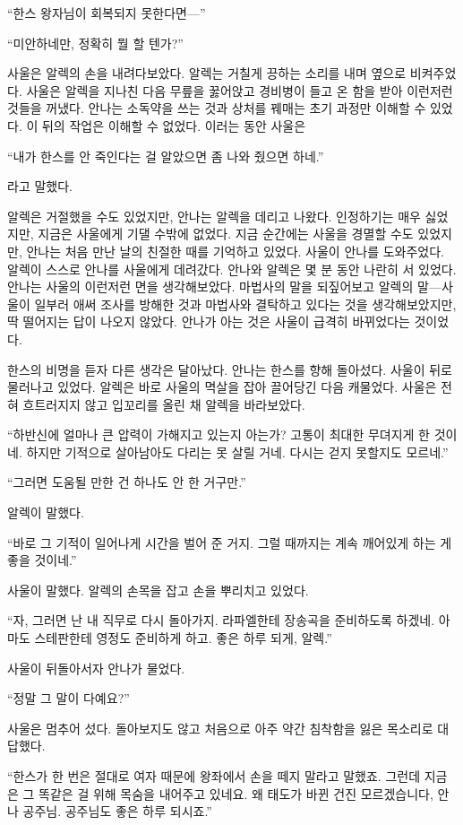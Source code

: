 ``한스 왕자님이 회복되지 못한다면—''

``미안하네만, 정확히 뭘 할 텐가?''

사울은 알렉의 손을 내려다보았다. 알렉는 거칠게 끙하는 소리를 내며 옆으로 비켜주었다. 사울은 알렉을 지나친 다음 무릎을 꿇어앉고 경비병이 들고 온 함을 받아 이런저런 것들을 꺼냈다. 안나는 소독약을 쓰는 것과 상처를 꿰매는 초기 과정만 이해할 수 있었다. 이 뒤의 작업은 이해할 수 없었다.  이러는 동안 사울은

``내가 한스를 안 죽인다는 걸 알았으면 좀 나와 줬으면 하네.''

라고 말했다.

알렉은 거절했을 수도 있었지만, 안나는 알렉을 데리고 나왔다. 인정하기는 매우 싫었지만, 지금은 사울에게 기댈 수밖에 없었다. 지금 순간에는 사울을 경멸할 수도 있었지만, 안나는 처음 만난 날의 친절한 때를 기억하고 있었다. 사울이 안나를 도와주었다. 알렉이 스스로 안나를 사울에게 데려갔다. 안나와 알렉은 몇 분 동안 나란히 서 있었다. 안나는 사울의 이런저런 면을 생각해보았다. 마법사의 말을 되짚어보고 알렉의 말—사울이 일부러 애써 조사를 방해한 것과 마법사와 결탁하고 있다는 것을 생각해보았지만, 딱 떨어지는 답이 나오지 않았다. 안나가 아는 것은 사울이 급격히 바뀌었다는 것이었다.

한스의 비명을 듣자 다른 생각은 달아났다. 안나는 한스를 향해 돌아섰다. 사울이 뒤로 물러나고 있었다. 알렉은 바로 사울의 멱살을 잡아 끌어당긴 다음 캐물었다. 사울은 전혀 흐트러지지 않고 입꼬리를 올린 채 알렉을 바라보았다.

``하반신에 얼마나 큰 압력이 가해지고 있는지 아는가? 고통이 최대한 무뎌지게 한 것이네. 하지만 기적으로 살아남아도 다리는 못 살릴 거네. 다시는 걷지 못할지도 모르네.''

``그러면 도움될 만한 건 하나도 안 한 거구만.''

알렉이 말했다.

``바로 그 기적이 일어나게 시간을 벌어 준 거지. 그럴 때까지는 계속 깨어있게 하는 게 좋을 것이네.''

사울이 말했다. 알렉의 손목을 잡고 손을 뿌리치고 있었다.

``자, 그러면 난 내 직무로 다시 돌아가지. 라파엘한테 장송곡을 준비하도록 하겠네. 아마도 스테판한테 영정도 준비하게 하고. 좋은 하루 되게, 알렉.''

사울이 뒤돌아서자 안나가 물었다.

``정말 그 말이 다예요?''

사울은 멈추어 섰다. 돌아보지도 않고 처음으로 아주 약간 침착함을 잃은 목소리로 대답했다.

``한스가 한 번은 절대로 여자 때문에 왕좌에서 손을 떼지 말라고 말했죠. 그런데 지금은 그 똑같은 걸 위해 목숨을 내어주고 있네요. 왜 태도가 바뀐 건진 모르겠습니다, 안나 공주님. 공주님도 좋은 하루 되시죠.''

